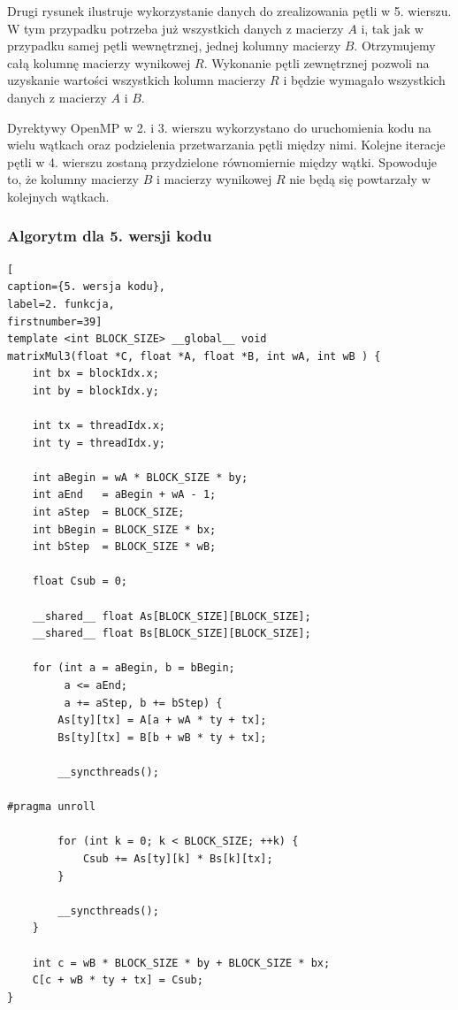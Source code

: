 \documentclass{article}
\begin{document}
Drugi rysunek ilustruje wykorzystanie danych do zrealizowania pętli w 5. wierszu. W tym przypadku potrzeba już wszystkich danych z macierzy $A$ i, tak jak w przypadku samej pętli wewnętrznej, jednej kolumny macierzy $B$. Otrzymujemy całą kolumnę macierzy wynikowej $R$. Wykonanie pętli zewnętrznej pozwoli na uzyskanie wartości wszystkich kolumn macierzy $R$ i będzie wymagało wszystkich danych z macierzy $A$ i $B$.

Dyrektywy OpenMP w 2. i 3. wierszu wykorzystano do uruchomienia kodu na wielu wątkach oraz podzielenia przetwarzania pętli między nimi. Kolejne iteracje pętli w 4. wierszu zostaną przydzielone równomiernie między wątki. Spowoduje to, że kolumny macierzy $B$ i macierzy wynikowej $R$ nie będą się powtarzały w kolejnych wątkach.

\subsubsection{Algorytm dla 5. wersji kodu}
\begin{lstlisting}[
caption={5. wersja kodu},
label=2. funkcja,
firstnumber=39]
template <int BLOCK_SIZE> __global__ void
matrixMul3(float *C, float *A, float *B, int wA, int wB ) {
    int bx = blockIdx.x;
    int by = blockIdx.y;
    
    int tx = threadIdx.x;
    int ty = threadIdx.y;
    
    int aBegin = wA * BLOCK_SIZE * by;
    int aEnd   = aBegin + wA - 1;
    int aStep  = BLOCK_SIZE;
    int bBegin = BLOCK_SIZE * bx;
    int bStep  = BLOCK_SIZE * wB;
    
    float Csub = 0;

    __shared__ float As[BLOCK_SIZE][BLOCK_SIZE];
    __shared__ float Bs[BLOCK_SIZE][BLOCK_SIZE];

    for (int a = aBegin, b = bBegin; 
    	 a <= aEnd;
    	 a += aStep, b += bStep) {
        As[ty][tx] = A[a + wA * ty + tx];
        Bs[ty][tx] = B[b + wB * ty + tx];
        
        __syncthreads();
        
#pragma unroll

        for (int k = 0; k < BLOCK_SIZE; ++k) {
            Csub += As[ty][k] * Bs[k][tx];
        }

        __syncthreads();
    }
    
    int c = wB * BLOCK_SIZE * by + BLOCK_SIZE * bx;
    C[c + wB * ty + tx] = Csub;    
}
\end{lstlisting}
\end{document}
